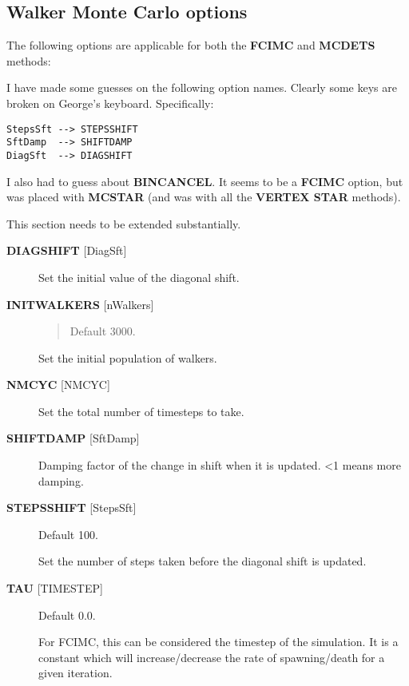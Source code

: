 \documentclass[openany,a4paper,10pt]{manual}
\begin{document}
\subsection{Walker Monte Carlo options}

The following options are applicable for both the \textbf{FCIMC} and \textbf{MCDETS} methods:

\begin{notice}[note]
I have made some guesses on the following option names.  Clearly some keys are broken
on George's keyboard.  Specifically:

\begin{Verbatim}[commandchars=@\[\]]
StepsSft --> STEPSSHIFT
SftDamp  --> SHIFTDAMP
DiagSft  --> DIAGSHIFT
\end{Verbatim}

I also had to guess about \textbf{BINCANCEL}.  It seems to be a \textbf{FCIMC}
option, but was placed with \textbf{MCSTAR} (and was with all the \textbf{VERTEX STAR}
methods).

This section needs to be extended substantially.
\end{notice}
\begin{description}
\item[\textbf{DIAGSHIFT} {[}DiagSft{]}]
Set the initial value of the diagonal shift.

\item[\textbf{INITWALKERS} {[}nWalkers{]}]\begin{quote}

Default 3000.
\end{quote}

Set the initial population of walkers.

\item[\textbf{NMCYC} {[}NMCYC{]}]
Set the total number of timesteps to take.

\item[\textbf{SHIFTDAMP}  {[}SftDamp{]}]
Damping factor of the change in shift when it is updated.  \textless{}1 means more damping.

\item[\textbf{STEPSSHIFT} {[}StepsSft{]}]
Default 100.

Set the number of steps taken before the diagonal shift is updated.

\item[\textbf{TAU} {[}TIMESTEP{]}]
Default 0.0.

For FCIMC, this can be considered the timestep of the simulation. It is a constant which
will increase/decrease the rate of spawning/death for a given iteration.

\end{description}
\end{document}
